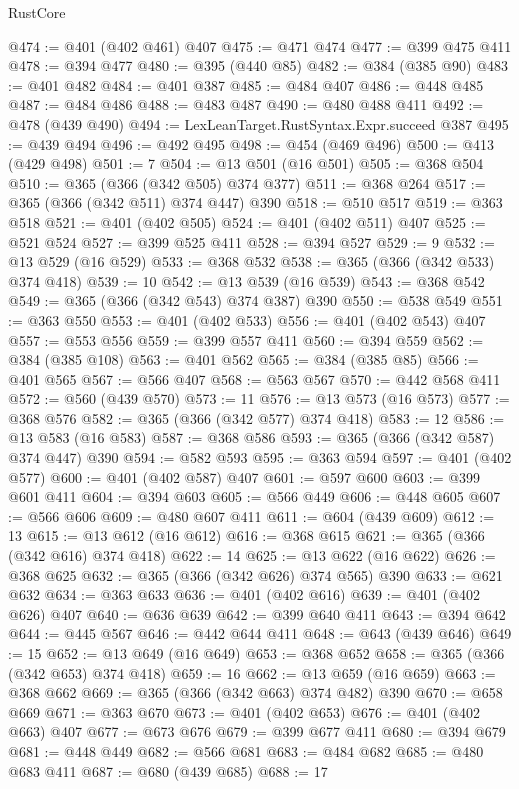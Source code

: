 \begin{lexlean}{RustCore}
\begin{coremodule}
@474 := @401 (@402 @461) @407
@475 := @471 @474
@477 := @399 @475 @411
@478 := @394 @477
@480 := @395 (@440 @85)
@482 := @384 (@385 @90)
@483 := @401 @482
@484 := @401 @387
@485 := @484 @407
@486 := @448 @485
@487 := @484 @486
@488 := @483 @487
@490 := @480 @488 @411
@492 := @478 (@439 @490)
@494 := LexLeanTarget.RustSyntax.Expr.succeed @387
@495 := @439 @494
@496 := @492 @495
@498 := @454 (@469 @496)
@500 := @413 (@429 @498)
@501 := 7
@504 := @13 @501 (@16 @501)
@505 := @368 @504
@510 := @365 (@366 (@342 @505) @374 @377)
@511 := @368 @264
@517 := @365 (@366 (@342 @511) @374 @447) @390
@518 := @510 @517
@519 := @363 @518
@521 := @401 (@402 @505)
@524 := @401 (@402 @511) @407
@525 := @521 @524
@527 := @399 @525 @411
@528 := @394 @527
@529 := 9
@532 := @13 @529 (@16 @529)
@533 := @368 @532
@538 := @365 (@366 (@342 @533) @374 @418)
@539 := 10
@542 := @13 @539 (@16 @539)
@543 := @368 @542
@549 := @365 (@366 (@342 @543) @374 @387) @390
@550 := @538 @549
@551 := @363 @550
@553 := @401 (@402 @533)
@556 := @401 (@402 @543) @407
@557 := @553 @556
@559 := @399 @557 @411
@560 := @394 @559
@562 := @384 (@385 @108)
@563 := @401 @562
@565 := @384 (@385 @85)
@566 := @401 @565
@567 := @566 @407
@568 := @563 @567
@570 := @442 @568 @411
@572 := @560 (@439 @570)
@573 := 11
@576 := @13 @573 (@16 @573)
@577 := @368 @576
@582 := @365 (@366 (@342 @577) @374 @418)
@583 := 12
@586 := @13 @583 (@16 @583)
@587 := @368 @586
@593 := @365 (@366 (@342 @587) @374 @447) @390
@594 := @582 @593
@595 := @363 @594
@597 := @401 (@402 @577)
@600 := @401 (@402 @587) @407
@601 := @597 @600
@603 := @399 @601 @411
@604 := @394 @603
@605 := @566 @449
@606 := @448 @605
@607 := @566 @606
@609 := @480 @607 @411
@611 := @604 (@439 @609)
@612 := 13
@615 := @13 @612 (@16 @612)
@616 := @368 @615
@621 := @365 (@366 (@342 @616) @374 @418)
@622 := 14
@625 := @13 @622 (@16 @622)
@626 := @368 @625
@632 := @365 (@366 (@342 @626) @374 @565) @390
@633 := @621 @632
@634 := @363 @633
@636 := @401 (@402 @616)
@639 := @401 (@402 @626) @407
@640 := @636 @639
@642 := @399 @640 @411
@643 := @394 @642
@644 := @445 @567
@646 := @442 @644 @411
@648 := @643 (@439 @646)
@649 := 15
@652 := @13 @649 (@16 @649)
@653 := @368 @652
@658 := @365 (@366 (@342 @653) @374 @418)
@659 := 16
@662 := @13 @659 (@16 @659)
@663 := @368 @662
@669 := @365 (@366 (@342 @663) @374 @482) @390
@670 := @658 @669
@671 := @363 @670
@673 := @401 (@402 @653)
@676 := @401 (@402 @663) @407
@677 := @673 @676
@679 := @399 @677 @411
@680 := @394 @679
@681 := @448 @449
@682 := @566 @681
@683 := @484 @682
@685 := @480 @683 @411
@687 := @680 (@439 @685)
@688 := 17

\end{coremodule}
\end{lexlean}
